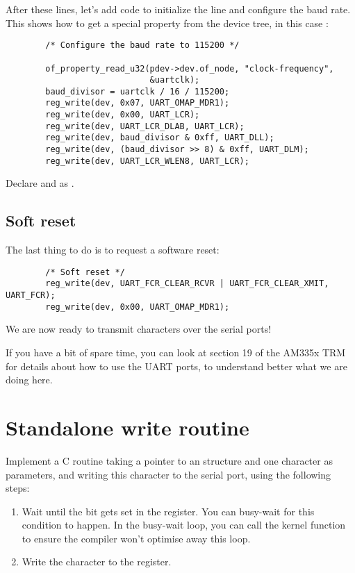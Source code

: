 After these lines, let's add code to initialize the line
and configure the baud rate. This shows how to get a special
property from the device tree, in this case :

\begin{verbatim}
        /* Configure the baud rate to 115200 */

        of_property_read_u32(pdev->dev.of_node, "clock-frequency",
                             &uartclk);
        baud_divisor = uartclk / 16 / 115200;
        reg_write(dev, 0x07, UART_OMAP_MDR1);
        reg_write(dev, 0x00, UART_LCR);
        reg_write(dev, UART_LCR_DLAB, UART_LCR);
        reg_write(dev, baud_divisor & 0xff, UART_DLL);
        reg_write(dev, (baud_divisor >> 8) & 0xff, UART_DLM);
        reg_write(dev, UART_LCR_WLEN8, UART_LCR);
\end{verbatim}

Declare  and  as .

\subsection{Soft reset}

The last thing to do is to request a software reset:

\begin{verbatim}
        /* Soft reset */
        reg_write(dev, UART_FCR_CLEAR_RCVR | UART_FCR_CLEAR_XMIT, UART_FCR);
        reg_write(dev, 0x00, UART_OMAP_MDR1);
\end{verbatim}

We are now ready to transmit characters over the serial ports!

If you have a bit of spare time, you can look at section 19 of the
AM335x TRM for details about how to use the UART ports, to understand
better what we are doing here.
 
\section{Standalone write routine}

Implement a C routine taking a pointer to an 
structure and one character as parameters, and writing
this character to the serial port, using the following steps:

\begin{enumerate}
\item Wait until the  bit gets set in the
   register.  You can busy-wait for this condition to happen.
  In the busy-wait loop, you can call the  kernel function
  to ensure the compiler won't optimise away this loop.
\item Write the character to the  register.
\end{enumerate}

